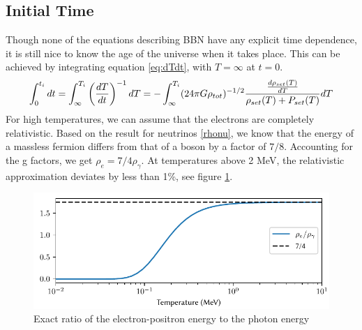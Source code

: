 \subsection{Initial Time}
\label{sec:t_ini}
Though none of the equations describing BBN have any explicit time dependence, it is still nice to know the age of the universe when it takes place. This can be achieved by integrating equation \eqref{eq:dTdt}, with $T=\infty$ at $t=0$.
\begin{align}
    \int_{0}^{t_i}dt=\int_{\infty}^{T_i}\left(\frac{dT}{dt}\right)^{-1}dT=-\int_{\infty}^{T_i}(24\pi G\rho_{tot})^{-1/2}\frac{\frac{d\rho_{set}(T)}{dT}}{\rho_{set}(T) + P_{set}(T)}dT
    \label{eq:ti_integral}
\end{align}
For high temperatures, we can assume that the electrons are completely relativistic. Based on the result for neutrinos \eqref{rhonu}, we know that the energy of a massless fermion differs from that of a boson by a factor of $7/8$. Accounting for the g factors, we get $\rho_e=7/4 \rho_\gamma$. At temperatures above 2 MeV, the relativistic approximation deviates by less than 1\%, see figure \ref{fig:rhoegammaT}.
\begin{figure}[ht]
    \includegraphics[width=5.1in]{figures/rhoegammaT.pdf}
    \caption{Exact ratio of the electron-positron energy to the photon energy}
    \label{fig:rhoegammaT}
\end{figure}

